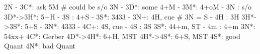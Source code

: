 2N - 
3C*: ask 5M  # could be s/o 3N
   - 3D*: some 4+M
        - 3M*: 4+oM
        - 3N : s/o
3D*->3H*: 5+H
        - 3S : 4+S
   - 3S*: 3433
   - 3N+: 4H, cue  # 3N = S
   - 4H : 3H
3H*->3S*: 5+S
   - 3N*: 4333
   - 4C+: 4S, cue
   - 4S : 3S
3S*: 44+m, ST
   - 4m : 4+m
3N*: 54xx+
4C*: Gerber
4D*->4H*: 6+H, MST
4H*->4S*: 6+S, MST
4S*: good Quant
4N*: bad Quant
